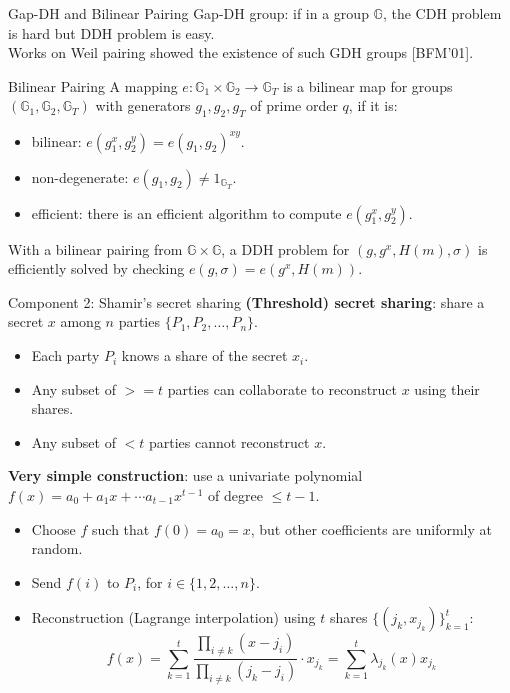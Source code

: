 \documentclass[10pt]{beamer}
\begin{document}
\begin{frame}{Gap-DH and Bilinear Pairing}
Gap-DH group: if in a group $\mathbb{G}$, the CDH problem is hard but DDH problem is easy. \\
\pause
Works on Weil pairing showed the existence of such GDH groups [BFM'01]. \\
\pause 
\begin{block}{Bilinear Pairing}
    A mapping $e: \mathbb{G}_1\times \mathbb{G}_2\to \mathbb{G}_T$ is a bilinear map for groups $(\mathbb{G}_1, \mathbb{G}_2, \mathbb{G}_T)$ with generators $g_1, g_2, g_T$ of prime order $q$, if it is:
    \begin{itemize}
        \item bilinear: $e(g_1^x, g_2^y) = e(g_1, g_2)^{xy}$. 
        \item non-degenerate: $e(g_1, g_2)\neq 1_{\mathbb{G}_T}$. 
        \item efficient: there is an efficient algorithm to compute $e(g_1^x, g_2^y)$. 
    \end{itemize}
\end{block}
\pause 
With a bilinear pairing from $\mathbb{G}\times \mathbb{G}$, a DDH problem for $(g, g^x, H(m),\sigma)$ is efficiently solved by checking $e(g, \sigma) = e(g^x, H(m))$.
\end{frame}

\begin{frame}{Component 2: Shamir's secret sharing}
\textbf{(Threshold) secret sharing}: share a secret $x$ among $n$ parties $\{P_1,P_2,\dots, P_n\}$. \\
\begin{itemize}
\item Each party $P_i$ knows a share of the secret $x_i$. \\
\item Any subset of $>=t$ parties can collaborate to reconstruct $x$ using their shares. \\
\item Any subset of $<t$ parties cannot reconstruct $x$. 
\end{itemize}
\pause 

\vspace{0.5em}
\textbf{Very simple construction}: use a univariate polynomial $f(x)=a_0 + a_1 x+\cdots a_{t-1}x^{t-1}$ of degree $\le t-1$. \\
\begin{itemize}
    \item Choose $f$ such that $f(0)=a_0=x$, but other coefficients are uniformly at random. 
    \item Send $f(i)$ to $P_i$, for $i\in\{1,2,\dots,n\}$. 
    \item Reconstruction (Lagrange interpolation) using $t$ shares $\{(j_k, x_{j_k})\}_{k=1}^t$: \begin{equation*} 
        f(x) = \sum_{k=1}^{t}\frac{\prod_{i \neq k } (x - j_i)}{\prod_{i \neq k } (j_k - j_i)}\cdot x_{j_k} = \sum_{k=1}^t \lambda_{j_k}(x) x_{j_k}
    \end{equation*}  
\end{itemize}
\end{frame}
\end{document}
